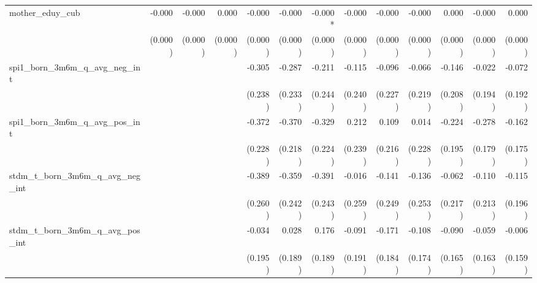 \begin{tabular}{lrrrrrrrrrrrr}
mother\_eduy\_cub                           &       -0.000 &       -0.000 &        0.000 &       -0.000 &       -0.000 &      -0.000* &       -0.000 &       -0.000 &       -0.000 &        0.000 &       -0.000 &        0.000 \\ 
                                            &      (0.000) &      (0.000) &      (0.000) &      (0.000) &      (0.000) &      (0.000) &      (0.000) &      (0.000) &      (0.000) &      (0.000) &      (0.000) &      (0.000) \\ 
spi1\_born\_3m6m\_q\_avg\_neg\_int          &              &              &              &       -0.305 &       -0.287 &       -0.211 &       -0.115 &       -0.096 &       -0.066 &       -0.146 &       -0.022 &       -0.072 \\ 
                                            &              &              &              &      (0.238) &      (0.233) &      (0.244) &      (0.240) &      (0.227) &      (0.219) &      (0.208) &      (0.194) &      (0.192) \\ 
spi1\_born\_3m6m\_q\_avg\_pos\_int          &              &              &              &       -0.372 &       -0.370 &       -0.329 &        0.212 &        0.109 &        0.014 &       -0.224 &       -0.278 &       -0.162 \\ 
                                            &              &              &              &      (0.228) &      (0.218) &      (0.224) &      (0.239) &      (0.216) &      (0.228) &      (0.195) &      (0.179) &      (0.175) \\ 
stdm\_t\_born\_3m6m\_q\_avg\_neg\_int       &              &              &              &       -0.389 &       -0.359 &       -0.391 &       -0.016 &       -0.141 &       -0.136 &       -0.062 &       -0.110 &       -0.115 \\ 
                                            &              &              &              &      (0.260) &      (0.242) &      (0.243) &      (0.259) &      (0.249) &      (0.253) &      (0.217) &      (0.213) &      (0.196) \\ 
stdm\_t\_born\_3m6m\_q\_avg\_pos\_int       &              &              &              &       -0.034 &        0.028 &        0.176 &       -0.091 &       -0.171 &       -0.108 &       -0.090 &       -0.059 &       -0.006 \\ 
                                            &              &              &              &      (0.195) &      (0.189) &      (0.189) &      (0.191) &      (0.184) &      (0.174) &      (0.165) &      (0.163) &      (0.159) \\ 

\end{tabular}
